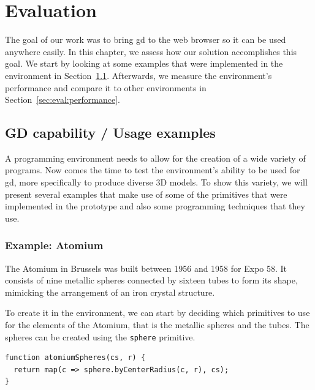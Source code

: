 
\chapter{Evaluation}
\label{chapter:evaluation}
The goal of our work was to bring \gls{gd} to the web browser so it can be used anywhere easily.
In this chapter, we assess how our solution accomplishes this goal.
We start by looking at some examples that were implemented in the environment in Section~\ref{sec:eval:gd:capable}.
Afterwards, we measure the environment's performance and compare it to other environments in Section~\ref{sec:eval:performance}.


\section{GD capability / Usage examples}
\label{sec:eval:gd:capable}
A programming environment needs to allow for the creation of a wide variety of programs.
Now comes the time to test the environment's ability to be used for \gls{gd}, more specifically to produce diverse 3D models.
To show this variety, we will present several examples that make use of some of the primitives that were implemented in the prototype and also some programming techniques that they use.



\subsection{Example: Atomium}
The Atomium in Brussels was built between 1956 and 1958 for Expo 58.
It consists of nine metallic spheres connected by sixteen tubes to form its shape, mimicking the arrangement of an iron crystal structure.

To create it in the environment, we can start by deciding which primitives to use for the elements of the Atomium, that is the metallic spheres and the tubes.
The spheres can be created using the {\tt sphere} primitive.

\begin{verbatim}
function atomiumSpheres(cs, r) {
  return map(c => sphere.byCenterRadius(c, r), cs);
}
\end{verbatim}

